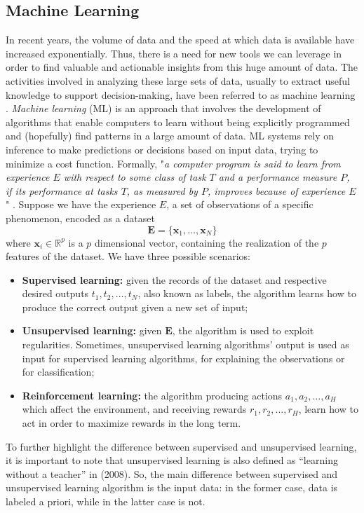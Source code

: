\subsection{Machine Learning}
\label{subsec:ml}
In recent years, the volume of data and the speed at which data is available have increased exponentially. Thus, there is a need for new tools we can leverage in order to find valuable and actionable insights from this huge amount of data. The activities involved in analyzing these large sets of data, usually to extract useful knowledge to support decision-making, have been referred to as machine learning \cite{vercellis_business_2009}. \emph{Machine learning} (ML) is an approach that involves the development of algorithms that enable computers to learn without being explicitly programmed and (hopefully) find patterns in a large amount of data. ML systems rely on inference to make predictions or decisions based on input data, trying to minimize a cost function. Formally, "\emph{a computer program is said to learn from experience $E$ with respect to some class of task $T$ and a performance measure $P$, if its performance at tasks $T$, as measured by $P$, improves because of experience $E$}" \cite{zaki_data_2020, pierluca_lanzi_data_2021}. Suppose we have the experience $E$, a set of observations of a specific phenomenon, encoded as a dataset
\begin{equation}
    \label{eq:dataset}
    \mathbf{E}=\{\mathbf{x}_1, \dots, \mathbf{x}_N\} 
\end{equation}
where $\mathbf{x}_i\in \mathbb{R}^p$ is a $p$ dimensional vector, containing the realization of the $p$ features of the dataset. We have three possible scenarios:
\begin{itemize}
    \item \textbf{Supervised learning:} given the records of the dataset and respective desired outputs $t_1, t_2, \dots, t_N$, also known as labels, the algorithm learns how to produce the correct output given a new set of input;
    \item \textbf{Unsupervised learning:} given $\mathbf{E}$, the algorithm is used to exploit regularities. Sometimes, unsupervised learning algorithms' output is used as input for supervised learning algorithms, for explaining the observations or for classification;
    \item \textbf{Reinforcement learning:} the algorithm producing actions $a_1, a_2, \dots, a_H$ which affect the environment, and receiving rewards $r_1, r_2, \dots, r_H$, learn how to act in order to maximize rewards in the long term.
\end{itemize}
To further highlight the difference between supervised and unsupervised learning, it is important to note that unsupervised learning is also defined as “learning without a teacher” in \citeauthor{tibshirani_elements_2008} (2008). So, the main difference between supervised and unsupervised learning algorithm is the input data: in the former case, data is labeled a priori, while in the latter case is not. 

